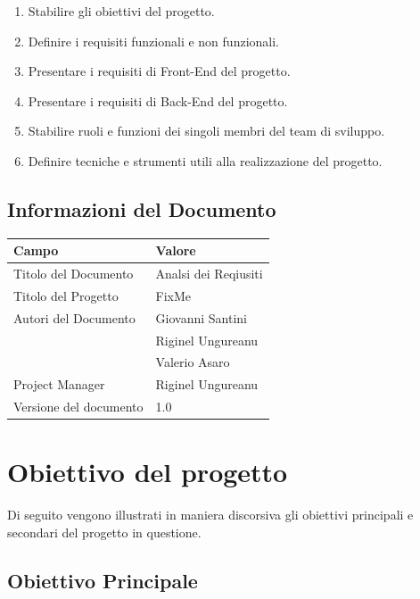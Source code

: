 \documentclass{report}
\begin{document}
\begin{enumerate}
		
	\item Stabilire gli obiettivi del progetto.
	\item Definire i requisiti funzionali e non funzionali.
	\item Presentare i requisiti di Front-End del progetto.
	\item Presentare i requisiti di Back-End del progetto.
	\item Stabilire ruoli e funzioni dei singoli membri del team di sviluppo.
	\item Definire tecniche e strumenti utili alla realizzazione del progetto.

\end{enumerate}


\section{Informazioni del Documento}

\begin{center} %
	\centering
	\begin{tabular}{ |p{4cm}|p{4cm}|  }
		\hline
		\centering Campo & \qquad\qquad Valore \\ %
		\hline
		Titolo del Documento & Analsi dei Reqiusiti \\
		\hline
		Titolo del Progetto & FixMe \\
		\hline
		Autori del Documento &
		Giovanni Santini \\ & Riginel Ungureanu \\ & Valerio Asaro \\
		\hline
		Project Manager & Riginel Ungureanu\\
		\hline
		Versione del documento & 1.0 \\
		\hline
	\end{tabular}
\end{center}

\chapter{Obiettivo del progetto}

Di seguito vengono illustrati in maniera discorsiva gli obiettivi principali e secondari del progetto in questione.

\section{Obiettivo Principale}
\end{document}
